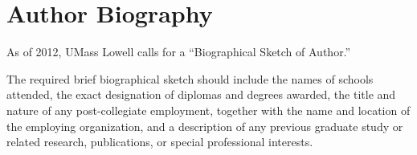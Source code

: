 \chapter{Author Biography}

As of 2012, UMass Lowell calls for a ``Biographical Sketch of Author.''

The required brief biographical sketch should include the names of schools attended, the exact designation of diplomas and degrees awarded, the title and nature of any post-collegiate employment, together with the name and location of the employing organization, and a description of any previous graduate study or related research, publications, or special professional interests.
